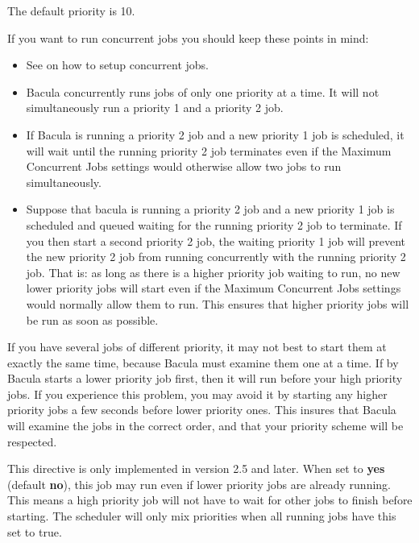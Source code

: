 \begin{description}
   The default priority is 10.  

   If you want to run concurrent jobs you should
   keep these points in mind:

\begin{itemize}
\item See  on how to setup
   concurrent jobs.

\item Bacula concurrently runs jobs of only one priority at a time.  It
   will not simultaneously run a priority 1 and a priority 2 job.

\item If Bacula is running a priority 2 job and a new priority 1 job is
   scheduled, it will wait until the running priority 2 job terminates even
   if the Maximum Concurrent Jobs settings would otherwise allow two jobs
   to run simultaneously.

\item Suppose that bacula is running a priority 2 job and a new priority 1
   job is scheduled and queued waiting for the running priority 2 job to
   terminate.  If you then start a second priority 2 job, the waiting
   priority 1 job will prevent the new priority 2 job from running
   concurrently with the running priority 2 job.  That is: as long as there
   is a higher priority job waiting to run, no new lower priority jobs will
   start even if the Maximum Concurrent Jobs settings would normally allow
   them to run.  This ensures that higher priority jobs will be run as soon
   as possible.
\end{itemize}

If you have several jobs of different priority, it may not best to start
them at exactly the same time, because Bacula must examine them one at a
time.  If by Bacula starts a lower priority job first, then it will run
before your high priority jobs.  If you experience this problem, you may
avoid it by starting any higher priority jobs a few seconds before lower
priority ones.  This insures that Bacula will examine the jobs in the
correct order, and that your priority scheme will be respected.

\label{AllowMixedPriority}
\item [Allow Mixed Priority = \lt{}yes\vb{}no\gt{}]
   This directive is only implemented in version 2.5 and later.  When
   set to {\bf yes} (default {\bf no}), this job may run even if lower
   priority jobs are already running.  This means a high priority job
   will not have to wait for other jobs to finish before starting.
   The scheduler will only mix priorities when all running jobs have
   this set to true.


\end{description}
